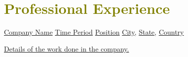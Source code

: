 
\section{\textcolor{olive}{\textbf{Professional Experience}}}
    \resumeSubHeadingListStart
    
    \resumeSubheading
        {\underline{Company Name}}
        {\underline{Time Period}}
        {\underline{Position}}
        {\textcolor{gray}{\footnotesize{\faMapMarker}} \underline{City}, \underline{State}, \underline{Country}}

        \resumeItemListStart
            \item \underline{Details of the work done in the company.}
        \resumeItemListEnd


    \resumeSubHeadingListEnd